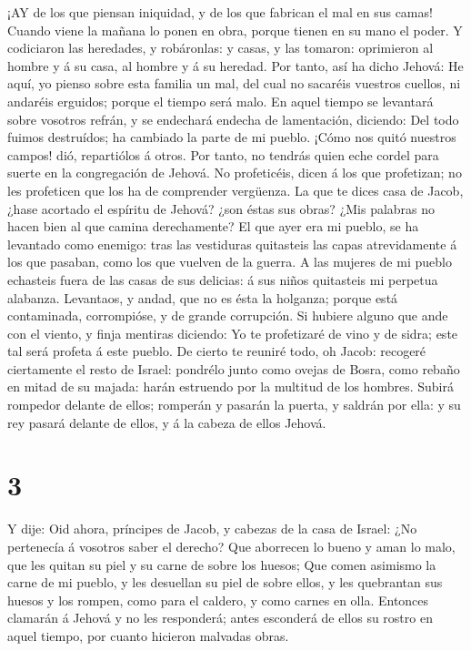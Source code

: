  ¡AY de los que piensan iniquidad, y de los que fabrican el
mal en sus camas! Cuando viene la mañana lo ponen en obra, porque tienen
en su mano el poder.  Y codiciaron las heredades, y
robáronlas: y casas, y las tomaron: oprimieron al hombre y á su casa, al
hombre y á su heredad.  Por tanto, así ha dicho Jehová: He
aquí, yo pienso sobre esta familia un mal, del cual no sacaréis vuestros
cuellos, ni andaréis erguidos; porque el tiempo será malo. 
En aquel tiempo se levantará sobre vosotros refrán, y se endechará
endecha de lamentación, diciendo: Del todo fuimos destruídos; ha
cambiado la parte de mi pueblo. ¡Cómo nos quitó nuestros campos! dió,
repartiólos á otros.  Por tanto, no tendrás quien eche
cordel para suerte en la congregación de Jehová.  No
profeticéis, dicen á los que profetizan; no les profeticen que los ha de
comprender vergüenza.  La que te dices casa de Jacob, ¿hase
acortado el espíritu de Jehová? ¿son éstas sus obras? ¿Mis palabras no
hacen bien al que camina derechamente?  El que ayer era mi
pueblo, se ha levantado como enemigo: tras las vestiduras quitasteis las
capas atrevidamente á los que pasaban, como los que vuelven de la
guerra.  A las mujeres de mi pueblo echasteis fuera de las
casas de sus delicias: á sus niños quitasteis mi perpetua alabanza.
 Levantaos, y andad, que no es ésta la holganza; porque
está contaminada, corrompióse, y de grande corrupción.  Si
hubiere alguno que ande con el viento, y finja mentiras diciendo: Yo te
profetizaré de vino y de sidra; este tal será profeta á este pueblo.
 De cierto te reuniré todo, oh Jacob: recogeré ciertamente
el resto de Israel: pondrélo junto como ovejas de Bosra, como rebaño en
mitad de su majada: harán estruendo por la multitud de los hombres.
 Subirá rompedor delante de ellos; romperán y pasarán la
puerta, y saldrán por ella: y su rey pasará delante de ellos, y á la
cabeza de ellos Jehová.

\hypertarget{section-2}{%
\section{3}\label{section-2}}

 Y dije: Oid ahora, príncipes de Jacob, y cabezas de la casa
de Israel: ¿No pertenecía á vosotros saber el derecho?  Que
aborrecen lo bueno y aman lo malo, que les quitan su piel y su carne de
sobre los huesos;  Que comen asimismo la carne de mi pueblo,
y les desuellan su piel de sobre ellos, y les quebrantan sus huesos y
los rompen, como para el caldero, y como carnes en olla. 
Entonces clamarán á Jehová y no les responderá; antes esconderá de ellos
su rostro en aquel tiempo, por cuanto hicieron malvadas obras.

